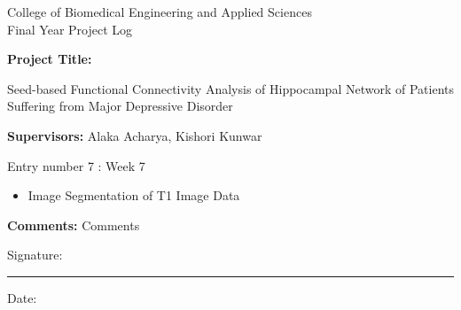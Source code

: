 \documentclass[12pt]{article}
\newcommand{\HRule}{\rule{5cm}{0.1mm}}
\begin{document}
\begin{center}
  {\Large College of Biomedical Engineering and Applied Sciences} \\ [2mm]
  {\large Final Year Project Log }
\end{center}

\vspace{1cm}

\textbf{Project Title:}

Seed-based Functional Connectivity Analysis of
Hippocampal Network of Patients Suffering from Major Depressive
Disorder

\textbf{Supervisors:} Alaka Acharya, Kishori Kunwar

\vspace{0.5cm}

Entry number 7 : Week 7

\begin{itemize}
  \item Image Segmentation of T1 Image Data
\end{itemize}

\textbf{Comments:} {Comments}

\vfill

Signature: \HRule \hspace*{50mm} Date:

\newpage
\end{document}
